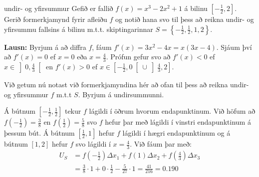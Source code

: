 \begin{syn}{undir- og yfirsummur}
Gefið er fallið $f(x) = x^3-2x^2+1$ á bilinu $\left[-\frac{1}{2},2\right]$. Gerið formerkjamynd fyrir afleiðu $f$ og notið hana svo til þess að reikna undir- og yfirsummu fallsins á bilinu m.t.t. skiptingarinnar $S =\left\{-\frac{1}{2},\frac{1}{2},1,2\right\}$.

\vspace{2mm}

{\bf Lausn:} Byrjum á að diffra $f$, fáum $f'(x) = 3x^{2}-4x = x\left(3x-4\right)$. Sjáum því að $f'(x) = 0$ ef $x = 0$ eða $x = \frac{4}{3}$. Prófun gefur svo að $f'(x) < 0$ ef $x \in \left]0,\frac{4}{3}\right[$ en $f'(x) > 0$ ef $x \in \left[-\frac{1}{2},0\right[ \cup \left]\frac{4}{3},2\right]$. 

\begin{center}
\scalebox{1.3}
{
}
\end{center}

Við getum nú notast við formerkjamyndina hér að ofan til þess að reikna undir- og yfirsummur $f$ m.t.t $S$. Byrjum á undirsummunni. 

\vspace{2mm}

Á bútnum $\left[-\frac{1}{2},\frac{1}{2}\right]$ tekur $f$ lágildi í öðrum hvorum endapunktinum. Við höfum að $f\left(-\frac{1}{2}\right) = \frac{3}{8}$ en $f\left(\frac{1}{2}\right) = \frac{5}{8}$ svo $f$ hefur þar með lágildi í vinstri endapunktinum á þessum bút. Á bútnum $\left[\frac{1}{2},1\right]$ hefur $f$ lágildi í hægri endapunktinum og á bútnum $\left[1,2\right]$ hefur $f$ svo lágildi í $x = \frac{4}{3}$. Við fáum þar með:
\setlength{\jot}{4mm}
\begin{align*}
U_{S} &= f\left(-\frac{1}{2}\right)\Delta x_{1}+f\left(1\right)\Delta x_{2}+f\left(\frac{4}{3}\right)\Delta x_{3}\\ &= \frac{3}{8}\cdot1+0\cdot\frac{1}{2}-\frac{5}{27}\cdot 1 = \frac{41}{216} = 0.190
\end{align*}


\end{syn}

